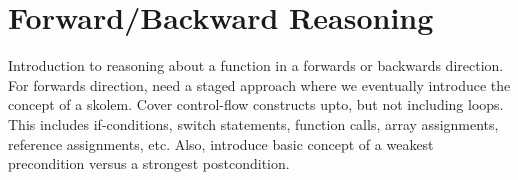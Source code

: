 \section{Forward/Backward Reasoning}

Introduction to reasoning about a function in a forwards or backwards direction.  For forwards direction, need a staged approach where we eventually introduce the concept of a skolem.  Cover control-flow constructs upto, but not including loops.  This includes if-conditions, switch statements, function calls, array assignments, reference assignments, etc.  Also, introduce basic concept of a weakest precondition versus a strongest postcondition.